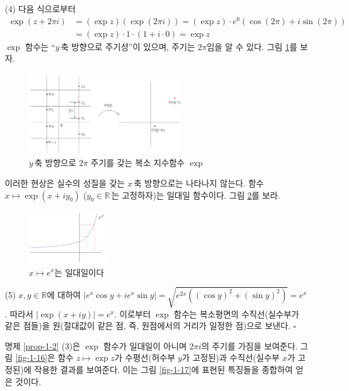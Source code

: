 \noindent
(4) 다음 식으로부터
\begin{align*}
\exp(z+2\pi i)
&= (\exp z)(\exp (2\pi i)) = (\exp z)\cdot e^0(\cos(2\pi) + i\sin(2\pi)) \\
&= (\exp z)\cdot 1\cdot(1+i\cdot 0) = \exp z
\end{align*}
$\exp$ 함수는 ``$y\,$축 방향으로 주기성''이 있으며, 주기는 $2\pi$임을 알 수 있다.
그림 \ref{fig-1-14}를 보자.

\begin{figure}[!h]
\begin{center}
\includegraphics[width=0.6\textwidth]{./SaltChapter/figs/fig-1-14}
\end{center}
\caption{$y\,$축 방향으로 $2\pi$ 주기를 갖는 복소 지수함수 $\exp$}
\label{fig-1-14}
\end{figure}

이러한 현상은 실수의 성질을 갖는 $x\,$축 방향으로는 나타나지 않는다.
함수 $x\mapsto \exp(x+iy_0)$ ($y_0\in \mathbb R\,$는 고정하자)는 일대일 함수이다.
그림 \ref{fig-1-15}를 보라.

\begin{figure}[!h]
\begin{center}
\includegraphics[width=0.3\textwidth]{./SaltChapter/figs/fig-1-15}
\end{center}
\caption{$x\mapsto e^x$는 일대일이다}
\label{fig-1-15}
\end{figure}

\noindent
(5) $x,y \in \mathbb R$에 대하여
$|e^x \cos y + ie^x\sin y| = \sqrt{e^{2x}((\cos y)^2 + (\sin y)^2)} = e^x$.
따라서 $|\exp(x+iy)| = e^x$.
이로부터 $\exp$ 함수는 복소평면의 수직선(실수부가 같은 점들)을
원(절대값이 같은 점, 즉, 원점에서의 거리가 일정한 점)으로 보낸다.
\hfill $\square$

명제 \ref{prop-1-2} (3)은 $\exp$ 함수가 일대일이 아니며
$2\pi i$의 주기를 가짐을 보여준다.
그림 \ref{fig-1-16}은 함수 $z\mapsto \exp z$가
수평선(허수부 $y$가 고정된)과 수직선(실수부 $x$가 고정된)에 작용한 결과를 보여준다.
이는 그림 \ref{fig-1-17}에 표현된 특징들을 종합하여 얻은 것이다.

